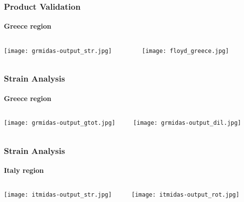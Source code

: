 \begin{frame}
 \frametitle{Product Validation}
 \framesubtitle{Greece region}
 \label{ch4:}
   
  \begin{columns}
    \begin{column}{0.5\textwidth}
      \begin{center}
        \texttt{[image: grmidas-output\_str.jpg]}
      \end{center}
    \end{column}
    \begin{column}{0.5\textwidth}
      \begin{center}
        \citet{Floyd2010}
        \texttt{[image: floyd\_greece.jpg]}     
      \end{center}
    \end{column}
  \end{columns}

\end{frame}
\note{}

\begin{frame}
  \frametitle{Strain Analysis}
  \framesubtitle{Greece region}
  \label{ch4:}
  \begin{columns}
    \begin{column}{0.5\textwidth}
      \begin{center}
        \texttt{[image: grmidas-output\_gtot.jpg]}   
      \end{center}
    \end{column}
    \begin{column}{0.5\textwidth}
      \begin{center}
        \texttt{[image: grmidas-output\_dil.jpg]}     
      \end{center}
    \end{column}
  
  \end{columns}

\end{frame}
\note{}


\begin{frame}
  \frametitle{Strain Analysis}
  \framesubtitle{Italy region}
  \label{ch4:}
  \begin{columns}
    \begin{column}{0.5\textwidth}
      \begin{center}
        \texttt{[image: itmidas-output\_str.jpg]}   
      \end{center}
    \end{column}
    \begin{column}{0.5\textwidth}
      \begin{center}
        \texttt{[image: itmidas-output\_rot.jpg]}     
      \end{center}
    \end{column}
  \end{columns}

\end{frame}
\note{}

